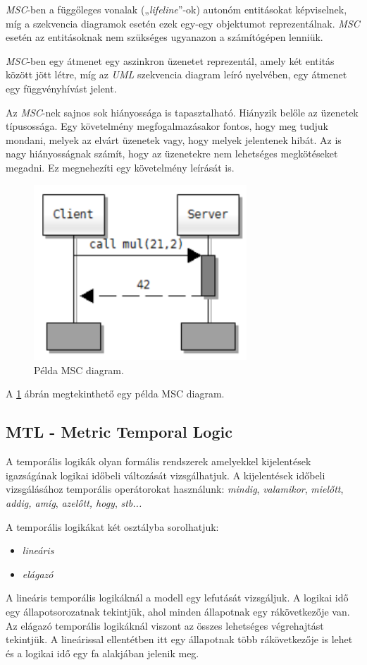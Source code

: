 \textit{MSC}-ben a függőleges vonalak („\textit{lifeline}”-ok) autonóm entitásokat képviselnek, míg a szekvencia diagramok esetén ezek egy-egy objektumot reprezentálnak.
\textit{MSC} esetén az entitásoknak nem szükséges ugyanazon a számítógépen lenniük.

\textit{MSC}-ben egy átmenet egy aszinkron üzenetet reprezentál, amely két entitás között jött létre, míg az \textit{UML} szekvencia diagram leíró nyelvében, egy átmenet egy függvényhívást jelent.

Az \textit{MSC}-nek sajnos sok hiányossága is tapasztalható.
Hiányzik belőle az üzenetek típusossága.
Egy követelmény megfogalmazásakor fontos, hogy meg tudjuk mondani, melyek az elvárt üzenetek vagy, hogy melyek jelentenek hibát.
Az is nagy hiányosságnak számít, hogy az üzenetekre nem lehetséges megkötéseket megadni.
Ez megnehezíti egy követelmény leírását is.

\begin{figure}[!ht]
    \centering
    \includegraphics[width=80mm, keepaspectratio]{figures/msc_example.png}
    \caption{Példa MSC diagram.}
    \label{msc_example}
\end{figure}

A \ref{msc_example} ábrán megtekinthető egy példa MSC diagram.

\clearpage\subsection{MTL - Metric Temporal Logic}

A temporális logikák olyan formális rendszerek amelyekkel kijelentések igazságának logikai időbeli változását vizsgálhatjuk.
A kijelentések időbeli vizsgálásához temporális operátorokat használunk: \textit{mindig}, \textit{valamikor}, \textit{mielőtt}, \textit{addig, amíg}, \textit{azelőtt, hogy}, \textit{stb...}

A temporális logikákat két osztályba sorolhatjuk:
\begin{itemize}
    \item \textit{lineáris}
    \item \textit{elágazó}
\end{itemize}
A lineáris temporális logikáknál a modell egy lefutását vizsgáljuk.
A logikai idő egy állapotsorozatnak tekintjük, ahol minden állapotnak egy rákövetkezője van.
Az elágazó temporális logikáknál viszont az összes lehetséges végrehajtást tekintjük.
A lineárissal ellentétben itt egy állapotnak több rákövetkezője is lehet és a logikai idő egy fa alakjában jelenik meg.

